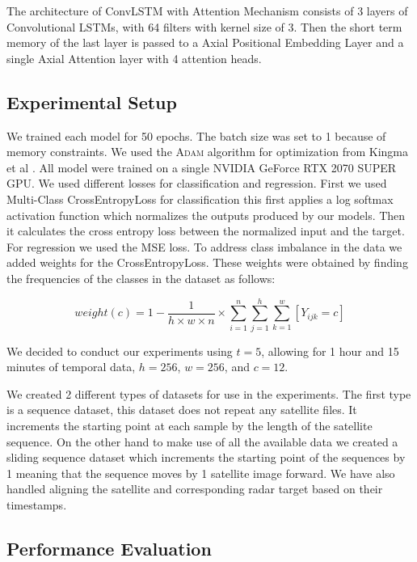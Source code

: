 The architecture of ConvLSTM with Attention Mechanism consists of 3 layers of Convolutional LSTMs,
with 64 filters with kernel size of 3. Then the short term memory of the last layer is passed to a Axial Positional Embedding Layer
and a single Axial Attention layer with 4 attention heads.  

\subsection{Experimental Setup}
We trained each model for 50 epochs. The batch size was set to 1 because of memory constraints. We used the \textsc{Adam} algorithm for optimization from Kingma et al \cite{kingma-2014}.
All model were trained on a single NVIDIA GeForce RTX 2070 SUPER GPU. We used different losses for classification and regression.
First we used Multi-Class CrossEntropyLoss for classification this first applies a log softmax activation function which normalizes the
outputs produced by our models. Then it calculates the cross entropy loss between the normalized input and the target.
For regression we used the MSE loss. To address class imbalance in the data we added weights for the CrossEntropyLoss. These weights were
obtained by finding the frequencies of the classes in the dataset as follows:

\begin{equation}
  weight(c) = 1 - \frac{1}{h\times w \times n} \times \sum_{i=1}^n \sum_{j=1}^h \sum_{k=1}^w [Y_{ijk} = c]
\end{equation}

We decided to conduct our experiments using $t = 5$, allowing for 1 hour and 15 minutes of temporal data, $h = 256$, $w = 256$, and $c = 12$.

We created 2 different types of datasets for use in the experiments.
The first type is a sequence dataset, this dataset does not repeat any satellite files. It increments the starting point at each sample
by the length of the satellite sequence. On the other hand to make use of all the available data we created a sliding sequence dataset which increments the starting point of the sequences by 1 meaning that the sequence moves by
1 satellite image forward. We have also handled aligning the satellite and corresponding radar target based on their timestamps. 

\subsection{Performance Evaluation}

